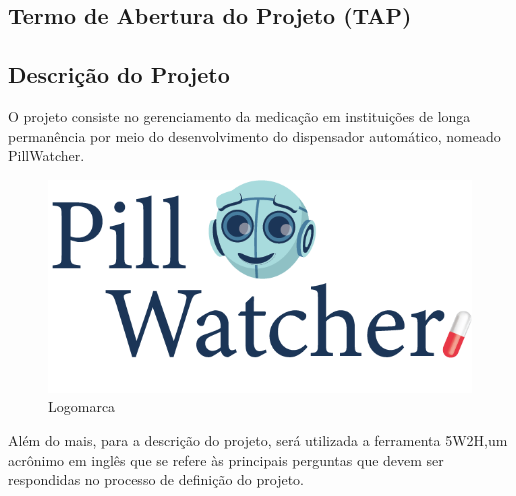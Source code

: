 \begin{apendicesenv}
\partapendices

\chapter{Termo de Abertura do Projeto (TAP)}
\label{ATP_app}
\section{Descrição do Projeto}

O projeto consiste no gerenciamento da medicação em instituições de longa permanência por meio do  desenvolvimento do dispensador automático, nomeado PillWatcher.


\begin{figure}[h]
    \centering
    \includegraphics[scale=2]{figuras/pillwatcher7.png}
    \caption{Logomarca}
    \label{fig:logo}
\end{figure}

Além do mais, para a descrição do projeto, será utilizada a ferramenta 5W2H,um acrônimo em inglês que se refere às principais perguntas que devem ser respondidas no processo de definição do projeto. 


\end{apendicesenv}
